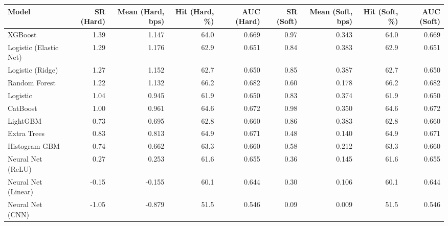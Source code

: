 \begin{tabular}{lrrrrrrrr}
\toprule
Model & SR (Hard) & Mean (Hard, bps) & Hit (Hard, \%) & AUC (Hard) & SR (Soft) & Mean (Soft, bps) & Hit (Soft, \%) & AUC (Soft) \\
\midrule
XGBoost & 1.39 & 1.147 & 64.0 & 0.669 & 0.97 & 0.343 & 64.0 & 0.669 \\
Logistic (Elastic Net) & 1.29 & 1.176 & 62.9 & 0.651 & 0.84 & 0.383 & 62.9 & 0.651 \\
Logistic (Ridge) & 1.27 & 1.152 & 62.7 & 0.650 & 0.85 & 0.387 & 62.7 & 0.650 \\
Random Forest & 1.22 & 1.132 & 66.2 & 0.682 & 0.60 & 0.178 & 66.2 & 0.682 \\
Logistic & 1.04 & 0.945 & 61.9 & 0.650 & 0.83 & 0.374 & 61.9 & 0.650 \\
CatBoost & 1.00 & 0.961 & 64.6 & 0.672 & 0.98 & 0.350 & 64.6 & 0.672 \\
LightGBM & 0.73 & 0.695 & 62.8 & 0.660 & 0.86 & 0.383 & 62.8 & 0.660 \\
Extra Trees & 0.83 & 0.813 & 64.9 & 0.671 & 0.48 & 0.140 & 64.9 & 0.671 \\
Histogram GBM & 0.74 & 0.662 & 63.3 & 0.660 & 0.58 & 0.212 & 63.3 & 0.660 \\
Neural Net (ReLU) & 0.27 & 0.253 & 61.6 & 0.655 & 0.36 & 0.145 & 61.6 & 0.655 \\
Neural Net (Linear) & -0.15 & -0.155 & 60.1 & 0.644 & 0.30 & 0.106 & 60.1 & 0.644 \\
Neural Net (CNN) & -1.05 & -0.879 & 51.5 & 0.546 & 0.09 & 0.009 & 51.5 & 0.546 \\
\bottomrule
\end{tabular}
